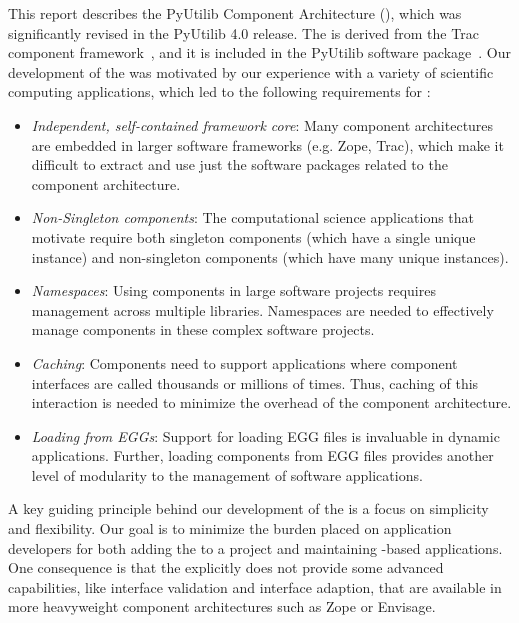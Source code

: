 This report describes the PyUtilib Component Architecture (\pca),
which was significantly revised in the PyUtilib 4.0 release.  The
\pcasp is derived from the Trac component framework~\cite{Trac},
and it is included in the PyUtilib software package~\cite{PyUtilib}.
Our development of the \pcasp was motivated by our experience with
a variety of scientific computing applications, which led to the
following requirements for \pca:
\begin{itemize}

\item \textit{Independent, self-contained framework core}: Many
  component architectures 
are embedded in larger software frameworks (e.g. Zope, Trac), which
  make it difficult 
to extract and use just the software packages related to the component
architecture.  

\item \textit{Non-Singleton components}:  The computational science
applications that motivate \pcasp require both singleton components
(which have a single unique instance) and non-singleton components
(which have many unique instances). 

\item \textit{Namespaces}:  Using components in large software projects
requires management across multiple libraries.  Namespaces are needed
to effectively manage components in these complex software projects.

\item \textit{Caching}:  Components need to support applications
where component interfaces are called thousands or millions of times.
Thus, caching of this 
interaction 
is needed to minimize the overhead of the component architecture.

\item \textit{Loading from EGGs}:  Support for loading EGG files is
invaluable in dynamic applications.  Further, loading components from EGG
files provides another level of modularity to the management of software
applications.

\end{itemize}

A key guiding principle behind our development of the \pcasp is a focus on
simplicity and flexibility.  Our goal is to minimize the burden placed
on application developers for both adding the \pcasp to a project and
maintaining \pca-based applications.  One consequence is that the \pcasp
explicitly does not provide some advanced capabilities, like interface
validation and interface adaption, that are available in more
heavyweight component architectures such as Zope or Envisage.

